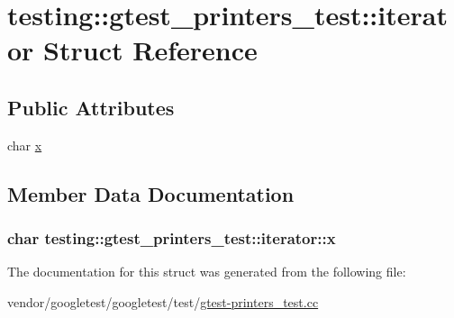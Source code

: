 \hypertarget{structtesting_1_1gtest__printers__test_1_1iterator}{}\section{testing\+:\+:gtest\+\_\+printers\+\_\+test\+:\+:iterator Struct Reference}
\label{structtesting_1_1gtest__printers__test_1_1iterator}
\subsection*{Public Attributes}
\begin{DoxyCompactItemize}
\item 
char \hyperlink{structtesting_1_1gtest__printers__test_1_1iterator_a3d4d056077d3b3869259bdfd60a0778f}{x}
\end{DoxyCompactItemize}


\subsection{Member Data Documentation}
\subsubsection[{\texorpdfstring{x}{x}}]{\setlength{\rightskip}{0pt plus 5cm}char testing\+::gtest\+\_\+printers\+\_\+test\+::iterator\+::x}\hypertarget{structtesting_1_1gtest__printers__test_1_1iterator_a3d4d056077d3b3869259bdfd60a0778f}{}\label{structtesting_1_1gtest__printers__test_1_1iterator_a3d4d056077d3b3869259bdfd60a0778f}


The documentation for this struct was generated from the following file\+:\begin{DoxyCompactItemize}
\item 
vendor/googletest/googletest/test/\hyperlink{gtest-printers__test_8cc}{gtest-\/printers\+\_\+test.\+cc}\end{DoxyCompactItemize}
